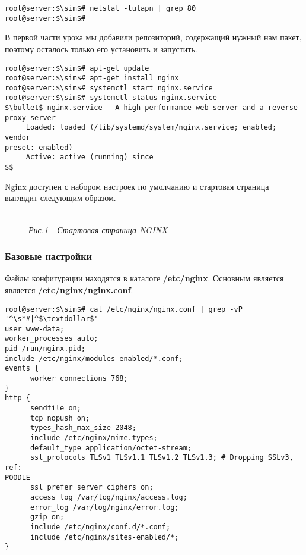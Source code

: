 \documentclass[14pt, a4paper]{article}
\begin{document}
\vspace{0.3cm}
\begin{lstlisting}
root@server:$\sim$# netstat -tulapn | grep 80
root@server:$\sim$#
\end{lstlisting}
\vspace{0.2cm}

В первой части урока мы добавили репозиторий, содержащий нужный нам пакет, поэтому осталось
только его установить и запустить.

\vspace{0.3cm}
\begin{lstlisting}
root@server:$\sim$# apt-get update
root@server:$\sim$# apt-get install nginx
root@server:$\sim$# systemctl start nginx.service
root@server:$\sim$# systemctl status nginx.service
$\bullet$ nginx.service - A high performance web server and a reverse proxy server
     Loaded: loaded (/lib/systemd/system/nginx.service; enabled; vendor 
preset: enabled)
     Active: active (running) since
$$
\end{lstlisting}
\vspace{0.2cm}

Nginx доступен с набором настроек по умолчанию и стартовая страница выглядит следующим
образом.

\begin{figure}[h]
    \centering
    \\ 
    \small\textit{Рис.1 - Стартовая страница NGINX}  
    \label{framework} 
\end{figure}

\subsubsection*{Базовые настройки} 

Файлы конфигурации находятся в каталоге \textbf{/etc/nginx}. Основным является является
\textbf{/etc/nginx/nginx.conf}.

\newpage

\begin{lstlisting}
root@server:$\sim$# cat /etc/nginx/nginx.conf | grep -vP '^\s*#|^$\textdollar$'
user www-data;
worker_processes auto;
pid /run/nginx.pid;
include /etc/nginx/modules-enabled/*.conf;
events {
      worker_connections 768;
}
http {
      sendfile on;
      tcp_nopush on;
      types_hash_max_size 2048;
      include /etc/nginx/mime.types;
      default_type application/octet-stream;
      ssl_protocols TLSv1 TLSv1.1 TLSv1.2 TLSv1.3; # Dropping SSLv3, ref: 
POODLE
      ssl_prefer_server_ciphers on;
      access_log /var/log/nginx/access.log;
      error_log /var/log/nginx/error.log;
      gzip on;
      include /etc/nginx/conf.d/*.conf;
      include /etc/nginx/sites-enabled/*;
}
\end{lstlisting}
\vspace{0.2cm}
\end{document}
